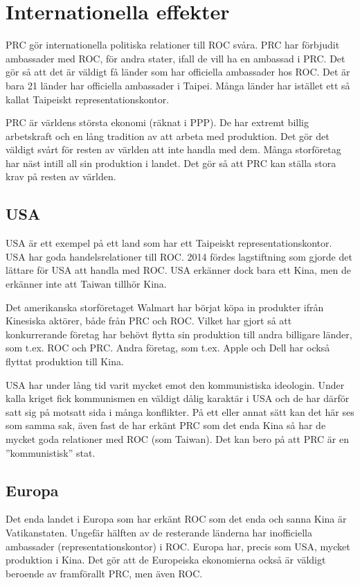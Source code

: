 \documentclass[a4paper,10pt]{article}
\begin{document}
\section*{Internationella effekter}
PRC gör internationella politiska relationer till ROC svåra. PRC har förbjudit ambassader med ROC, för andra stater, ifall de vill ha en ambassad i PRC. Det gör så att det är väldigt få länder som har officiella ambassader hos ROC. Det är bara 21 länder har officiella ambassader i Taipei. Många länder har istället ett så kallat Taipeiskt representationskontor. 

PRC är världens största ekonomi (räknat i PPP). De har extremt billig arbetskraft och en lång tradition av att arbeta med produktion. Det gör det väldigt svårt för resten av världen att inte handla med dem. Många storföretag har näst intill all sin produktion i landet. Det gör så att PRC kan ställa stora krav på resten av världen.

\subsection*{USA}
USA är ett exempel på ett land som har ett Taipeiskt representationskontor. USA har goda handelsrelationer till ROC. 2014 fördes lagstiftning som gjorde det lättare för USA att handla med ROC. USA erkänner dock bara ett Kina, men de erkänner inte att Taiwan tillhör Kina.

Det amerikanska storföretaget Walmart har börjat köpa in produkter ifrån Kinesiska aktörer, både från PRC och ROC. Vilket har gjort så att konkurrerande företag har behövt flytta sin produktion till andra billigare länder, som t.ex. ROC och PRC. Andra företag, som t.ex. Apple och Dell har också flyttat produktion till Kina.

USA har under lång tid varit mycket emot den kommunistiska ideologin. Under kalla kriget fick kommunismen en väldigt dålig karaktär i USA och de har därför satt sig på motsatt sida i många konflikter. På ett eller annat sätt kan det här ses som samma sak, även fast de har erkänt PRC som det enda Kina så har de mycket goda relationer med ROC (som Taiwan). Det kan bero på att PRC är en ''kommunistisk'' stat.

\subsection*{Europa}
Det enda landet i Europa som har erkänt ROC som det enda och sanna Kina är Vatikanstaten. Ungefär hälften av de resterande länderna har inofficiella ambassader (representationskontor) i ROC. Europa har, precis som USA, mycket produktion i Kina. Det gör att de Europeiska ekonomierna också är väldigt beroende av framförallt PRC, men även ROC. 
\end{document}
